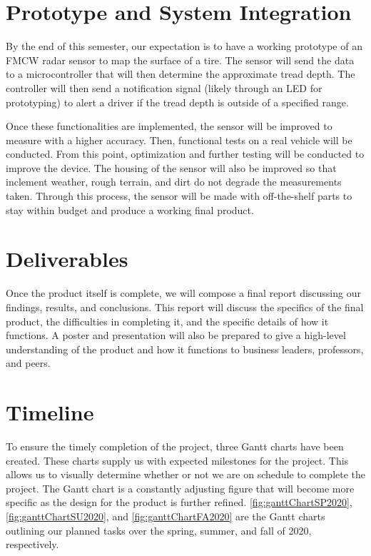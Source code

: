 \documentclass[11pt]{IEEEtran}
\begin{document}
	\section{Prototype and System Integration}
		By the end of this semester, our expectation is to have a working prototype of an FMCW radar sensor to map the surface of a tire. The sensor will send the data to a microcontroller that will then determine the approximate tread depth. The controller will then send a notification signal (likely through an LED for prototyping) to alert a driver if the tread depth is outside of a specified range.

		Once these functionalities are implemented, the sensor will be improved to measure with a higher accuracy. Then, functional tests on a real vehicle will be conducted. From this point, optimization and further testing will be conducted to improve the device. The housing of the sensor will also be improved so that inclement weather, rough terrain, and dirt do not degrade the measurements taken. Through this process, the sensor will be made with off-the-shelf parts to stay within budget and produce a working final product.


	\section{Deliverables}
		Once the product itself is complete, we will compose a final report discussing our findings, results, and conclusions. This report will discuss the specifics of the final product, the difficulties in completing it, and the specific details of how it functions. A poster and presentation will also be prepared to give a high-level understanding of the product and how it functions to business leaders, professors, and peers.


	\section{Timeline}
		To ensure the timely completion of the project, three Gantt charts have been created. These charts supply us with expected milestones for the project. This allows us to visually determine whether or not we are on schedule to complete the project. The Gantt chart is a constantly adjusting figure that will become more specific as the design for the product is further refined. \autoref{fig:ganttChartSP2020}, \autoref{fig:ganttChartSU2020}, and \autoref{fig:ganttChartFA2020} are the Gantt charts outlining our planned tasks over the spring, summer, and fall of 2020, respectively.
\end{document}
